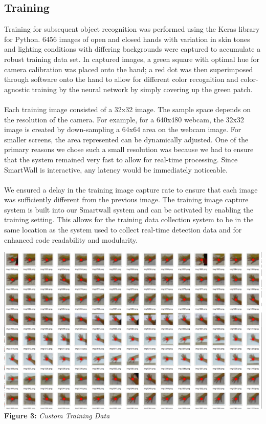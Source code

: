 \documentclass[twoside,twocolumn]{article}
\begin{document}
\subsection{Training}
Training for subsequent object recognition was performed using the Keras library for Python. 6456 images of open and closed hands with variation in skin tones and lighting conditions with differing backgrounds were captured to accumulate a robust training data set. In captured images, a green square with optimal hue for camera calibration was placed onto the hand; a red dot was then superimposed through software onto the hand to allow for different color recognition and color-agnostic training by the neural network by simply covering up the green patch. \\ \\
Each training image consisted of a 32x32 image. The sample space depends on the resolution of the camera. For example, for a 640x480 webcam, the 32x32 image is created by down-sampling a 64x64 area on the webcam image. For smaller screens, the area represented can be dynamically adjusted. One of the primary reasons we chose such a small resolution was because we had to ensure that the system remained very fast to allow for real-time processing. Since SmartWall is interactive, any latency would be immediately noticeable. \\ \\
We ensured a delay in the training image capture rate to ensure that each image was sufficiently different from the previous image. The training image capture system is built into our Smartwall system and can be activated by enabling the training setting. This allows for the training data collection system to be in the same location as the system used to collect real-time detection data and for enhanced code readability and modularity.

\begin{center}
\includegraphics[scale=0.27]{training_data} \\
\vspace{0.25cm}
\small{\textbf{Figure 3:} \textit{Custom Training Data}}
\end{center}
\end{document}
